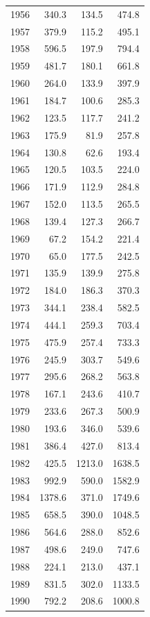 \documentclass[12pt,]{article}
\begin{document}
\begin{longtable}{rrrr}
  1956 & 340.3 & 134.5 & 474.8 \\ 
  1957 & 379.9 & 115.2 & 495.1 \\ 
  1958 & 596.5 & 197.9 & 794.4 \\ 
  1959 & 481.7 & 180.1 & 661.8 \\ 
  1960 & 264.0 & 133.9 & 397.9 \\ 
  1961 & 184.7 & 100.6 & 285.3 \\ 
  1962 & 123.5 & 117.7 & 241.2 \\ 
  1963 & 175.9 & 81.9 & 257.8 \\ 
  1964 & 130.8 & 62.6 & 193.4 \\ 
  1965 & 120.5 & 103.5 & 224.0 \\ 
  1966 & 171.9 & 112.9 & 284.8 \\ 
  1967 & 152.0 & 113.5 & 265.5 \\ 
  1968 & 139.4 & 127.3 & 266.7 \\ 
  1969 & 67.2 & 154.2 & 221.4 \\ 
  1970 & 65.0 & 177.5 & 242.5 \\ 
  1971 & 135.9 & 139.9 & 275.8 \\ 
  1972 & 184.0 & 186.3 & 370.3 \\ 
  1973 & 344.1 & 238.4 & 582.5 \\ 
  1974 & 444.1 & 259.3 & 703.4 \\ 
  1975 & 475.9 & 257.4 & 733.3 \\ 
  1976 & 245.9 & 303.7 & 549.6 \\ 
  1977 & 295.6 & 268.2 & 563.8 \\ 
  1978 & 167.1 & 243.6 & 410.7 \\ 
  1979 & 233.6 & 267.3 & 500.9 \\ 
  1980 & 193.6 & 346.0 & 539.6 \\ 
  1981 & 386.4 & 427.0 & 813.4 \\ 
  1982 & 425.5 & 1213.0 & 1638.5 \\ 
  1983 & 992.9 & 590.0 & 1582.9 \\ 
  1984 & 1378.6 & 371.0 & 1749.6 \\ 
  1985 & 658.5 & 390.0 & 1048.5 \\ 
  1986 & 564.6 & 288.0 & 852.6 \\ 
  1987 & 498.6 & 249.0 & 747.6 \\ 
  1988 & 224.1 & 213.0 & 437.1 \\ 
  1989 & 831.5 & 302.0 & 1133.5 \\ 
  1990 & 792.2 & 208.6 & 1000.8 \\ 

\end{longtable}
\end{document}
